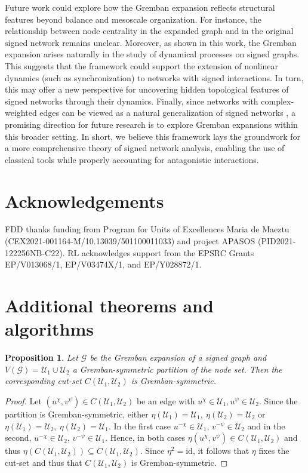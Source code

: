 \documentclass[reprint,onecolumn]{article}
\newtheorem{proposition}[theorem]{Proposition}
\newcommand{\mc}[1]{\mathcal{#1}}
\newcommand{\1}{\mathbb{1}}
\newcommand{\0}{\mathbf{0}}
\begin{document}
 Future work could explore how the
Gremban expansion reflects structural features beyond balance and mesoscale organization. For instance, the relationship between node centrality in the expanded graph and in the original signed network remains unclear. Moreover, as shown in this work, the Gremban expansion arises naturally in the study of dynamical processes on signed graphs. This suggests that the framework could support the extension of nonlinear dynamics (such as synchronization) to networks with signed interactions. In turn, this may offer a new perspective for uncovering hidden topological features of signed networks through their dynamics. 
Finally, since networks with complex-weighted edges can be viewed as a natural generalization of signed networks \cite{BottcherPorter2024,tian2024structural}, a promising direction for future research is to explore Gremban expansions within this broader setting.
In short, we believe this framework lays the groundwork for a more comprehensive theory of signed network analysis,  enabling the use of classical tools  while properly accounting for antagonistic interactions.

\section*{Acknowledgements}
FDD thanks funding from Program for Units of Excellences Maria de Maeztu (CEX2021-001164-M/10.13039/501100011033) and project APASOS (PID2021-122256NB-C22).
RL acknowledges support from the EPSRC Grants EP/V013068/1, EP/V03474X/1, and EP/Y028872/1.


 

\newpage
\appendix
%
\section{Additional theorems and algorithms} \label{app:extra_theorems}

\begin{proposition}  \label{prop:GS_cut_set}
    Let $\mc G$ be the Gremban expansion of a signed graph and $V(\mc G)=\mc U_1 \cup \mc U_2 $ a Gremban-symmetric partition of the node set. Then the corresponding cut-set $C(\mc U_1, \mc U_2)$ is Gremban-symmetric. 
\end{proposition}

\begin{proof}
Let $(u^\chi,v^\psi)\in C(\mc U_1,\mc U_2)$ be an edge with $u^\chi\in\mathcal{U}_1,u^\psi\in\mathcal{U}_2$. Since the partition is Gremban-symmetric, either $\eta(\mc U_1)=\mc U_1,\ \eta(\mc U_2)=\mc U_2$ or $\eta(\mc U_1)=\mc U_2,\ \eta(\mc U_2)=\mc U_1$. In the first case $u^{-\chi}\in\mc U_1$, $v^{-\psi}\in\mc U_2$ and in the second, $u^{-\chi}\in\mc U_2$, $v^{-\psi}\in\mc U_1$. Hence, in both cases $\eta(u^\chi,v^\psi)\in C(\mathcal{U}_1,\mathcal{U}_2)$ and thus $\eta(C(\mathcal{U}_1,\mathcal{U}_2))\subseteq C(\mathcal{U}_1,\mathcal{U}_2)$. Since $\eta^2=\mathrm{id}$, it follows that $\eta$ fixes the cut-set and thus that $C(\mathcal{U}_1,\mathcal{U}_2)$ is Gremban-symmetric.
\end{proof}
\end{document}
